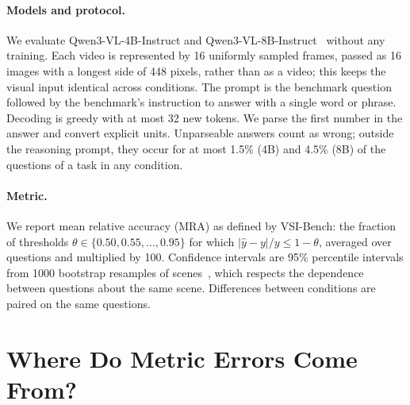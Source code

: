 \documentclass[letterpaper]{article} %
\begin{document}
\paragraph{Models and protocol.}
We evaluate Qwen3-VL-4B-Instruct and Qwen3-VL-8B-Instruct~\citep{bai2025qwen3vl} without any training. Each video is represented by 16 uniformly sampled frames, passed as 16 images with a longest side of 448 pixels, rather than as a video; this keeps the visual input identical across conditions. The prompt is the benchmark question followed by the benchmark's instruction to answer with a single word or phrase. Decoding is greedy with at most 32 new tokens. We parse the first number in the answer and convert explicit units. Unparseable answers count as wrong; outside the reasoning prompt, they occur for at most 1.5\% (4B) and 4.5\% (8B) of the questions of a task in any condition.

\paragraph{Metric.}
We report mean relative accuracy (MRA) as defined by VSI-Bench: the fraction of thresholds $\theta \in \{0.50, 0.55, \dots, 0.95\}$ for which $|\hat y - y|/y \le 1-\theta$, averaged over questions and multiplied by 100. Confidence intervals are 95\% percentile intervals from 1000 bootstrap resamples of scenes~\citep{efron1993bootstrap}, which respects the dependence between questions about the same scene. Differences between conditions are paired on the same questions.

\section{Where Do Metric Errors Come From?}
\label{sec:where}
\end{document}
